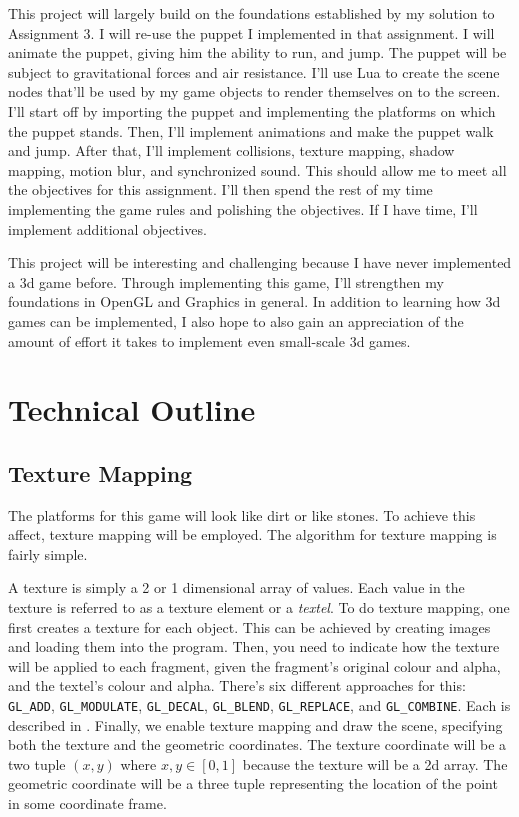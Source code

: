 \documentclass[11pt]{article}
\begin{document}
This project will largely build on the foundations established by my solution to Assignment 3. I will re-use the  puppet I implemented in that assignment. I will animate the puppet, giving him the ability to run, and jump. The puppet will be subject to gravitational forces and air resistance. I'll use Lua to create the scene nodes that'll be used by my game objects to render themselves on to the screen. I'll start off by importing the puppet and implementing the platforms on which the puppet stands. Then, I'll implement animations and make the puppet walk and jump. After that, I'll implement collisions, texture mapping, shadow mapping, motion blur, and synchronized sound. This should allow me to meet all the objectives for this assignment. I'll then spend the rest of my time implementing the game rules and polishing the objectives. If I have time, I'll implement additional objectives.

This project will be interesting and challenging because I have never implemented a 3d game before. Through implementing this game, I'll strengthen my foundations in OpenGL and Graphics in general. In addition to learning how 3d games can be implemented, I also hope to also gain an appreciation of the amount of effort it takes to implement even small-scale 3d games.

\section{Technical Outline}
\subsection{Texture Mapping}
The platforms for this game will look like dirt or like stones. To achieve this affect, texture mapping will be employed. The algorithm for texture mapping is fairly simple.

A texture is simply a 2 or 1 dimensional array of values. Each value in the texture is referred to as a texture element or a \textit{textel}. To do texture mapping, one first creates a texture for each object. This can be achieved by creating images and loading them into the program. Then, you need to indicate how the texture will be applied to each fragment, given the fragment's original colour and alpha, and the textel's colour and alpha. There's six different approaches for this: \verb|GL_ADD|, \verb|GL_MODULATE|, \verb|GL_DECAL|, \verb|GL_BLEND|, \verb|GL_REPLACE|, and \verb|GL_COMBINE|. Each is described in \cite{texture-map-fn}. Finally, we enable texture mapping and draw the scene, specifying both the texture and the geometric coordinates. The texture coordinate will be a two tuple $(x, y)$ where $x,y \in [0, 1]$ because the texture will be a 2d array. The geometric coordinate will be a three tuple representing the location of the point in some coordinate frame.
\end{document}
